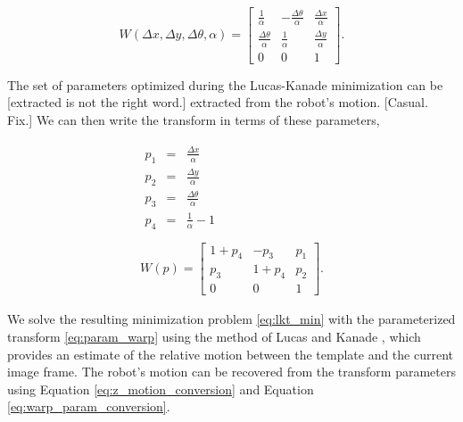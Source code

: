 \documentclass[letterpaper, 10 pt, conference]{ieeeconf}
\newcommand{\comment}[1]{{\color{red}[#1]}}
\begin{document}

\begin{equation*}
W(\Delta x, \Delta y, \Delta \theta, \alpha) = \begin{bmatrix} \frac{1}{\alpha} & -\frac{\Delta \theta}{\alpha} & \frac{\Delta x}{\alpha} \\ \frac{\Delta \theta}{\alpha} & \frac{1}{\alpha} & \frac{\Delta y}{\alpha} \\ 0 & 0 & 1 \end{bmatrix}.
\end{equation*}

The set of parameters optimized during the Lucas-Kanade minimization can be \comment{extracted is not the right word.} extracted from the robot's motion. 
\comment{Casual. Fix.} We can then write the transform in terms of these parameters,


\begin{eqnarray}
\begin{split} \label{eq:warp_param_conversion}
p_1 &=& \frac{\Delta x}{\alpha}\\
p_2 &=& \frac{\Delta y}{\alpha}\\
p_3 &=& \frac{\Delta \theta}{\alpha}\\
p_4 &=& \frac{1}{\alpha} - 1\\
\end{split}
\\ \label{eq:param_warp}
W(p) = \begin{bmatrix} 1+p_4 & -p_3 & p_1 \\ p_3 & 1+p_4 & p_2 \\ 0 & 0 & 1 \end{bmatrix}.
\end{eqnarray}

We solve the resulting minimization problem \eqref{eq:lkt_min} with the parameterized transform \eqref{eq:param_warp} using the method of Lucas and Kanade \cite{Lucas81, lucaskanade}, which provides an estimate of the relative motion between the template and the current image frame. The robot's motion can be recovered from the transform parameters using Equation \eqref{eq:z_motion_conversion} and Equation \eqref{eq:warp_param_conversion}.
\end{document}
